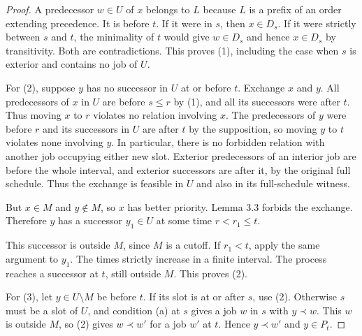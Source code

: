 \begin{proof}
A predecessor \(w\in U\) of \(x\) belongs to \(L\) because \(L\) is a prefix of an order extending precedence. It is before \(t\). If it were in \(s\), then \(x\in D_s\). If it were strictly between \(s\) and \(t\), the minimality of \(t\) would give \(w\in D_s\) and hence \(x\in D_s\) by transitivity. Both are contradictions. This proves (1), including the case when \(s\) is exterior and contains no job of \(U\).

For (2), suppose \(y\) has no successor in \(U\) at or before \(t\). Exchange \(x\) and \(y\). All predecessors of \(x\) in \(U\) are before \(s\leq r\) by (1), and all its successors were after \(t\). Thus moving \(x\) to \(r\) violates no relation involving \(x\). The predecessors of \(y\) were before \(r\) and its successors in \(U\) are after \(t\) by the supposition, so moving \(y\) to \(t\) violates none involving \(y\). In particular, there is no forbidden relation with another job occupying either new slot. Exterior predecessors of an interior job are before the whole interval, and exterior successors are after it, by the original full schedule. Thus the exchange is feasible in \(U\) and also in its full-schedule witness.

But \(x\in M\) and \(y\notin M\), so \(x\) has better priority. Lemma 3.3 forbids the exchange. Therefore \(y\) has a successor \(y_1\in U\) at some time \(r<r_1\leq t\).

This successor is outside \(M\), since \(M\) is a cutoff. If \(r_1<t\), apply the same argument to \(y_1\). The times strictly increase in a finite interval. The process reaches a successor at \(t\), still outside \(M\). This proves (2).

For (3), let \(y\in U\setminus M\) be before \(t\). If its slot is at or after \(s\), use (2). Otherwise \(s\) must be a slot of \(U\), and condition (a) at \(s\) gives a job \(w\) in \(s\) with \(y\prec w\). This \(w\) is outside \(M\), so (2) gives \(w\prec w'\) for a job \(w'\) at \(t\). Hence \(y\prec w'\) and \(y\in P_t\).
\end{proof}

